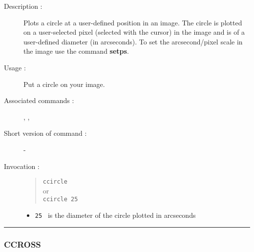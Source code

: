 \begin{description}

\item[Description :] Plots a circle at a user-defined position in an image. 
The circle is plotted on a user-selected pixel (selected with the cursor) in
the image and is of a user-defined diameter (in arcseconds).  To set the
arcsecond/pixel scale in the image use the command {\bf setps}.

\item[Usage :] Put a circle on your image.
\item[Associated commands :] {\tt {}}, 
{\tt {}}, {\tt {}}
\item[Short version of command :] -
\item[Invocation :]

\begin{quote}{\tt  ccircle }\\
or \\
{\tt ccircle 25 }
\end{quote}

\begin{itemize}

\item {\tt 25 } is the diameter of the circle plotted in arcseconds

\end{itemize}

\end{description}

\hrule 
\subsubsection*{\label{CCROSS}CCROSS}


